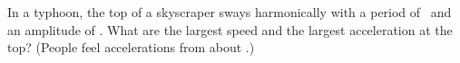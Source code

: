 In a typhoon, the top of a skyscraper sways harmonically with a period of \TO\ and an amplitude of \AO. What are the largest speed and the largest acceleration at the top? (People feel accelerations from about \afO.)
